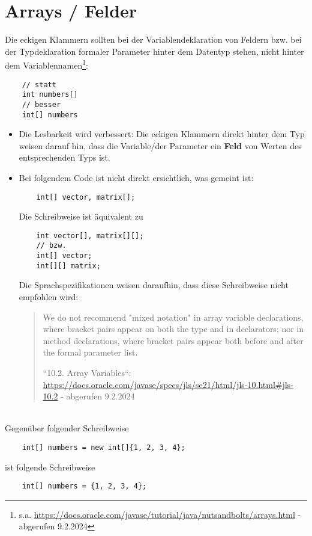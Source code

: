 \section{Arrays / Felder}
Die eckigen Klammern sollten bei der Variablendeklaration von Feldern {bzw.} bei der Typdeklaration formaler Parameter hinter dem Datentyp stehen, nicht hinter dem Variablennamen\footnote{
    s.a. \url{https://docs.oracle.com/javase/tutorial/java/nutsandbolts/arrays.html} - abgerufen 9.2.2024}:

\begin{verbatim}
    // statt
    int numbers[]
    // besser
    int[] numbers
\end{verbatim}

\begin{itemize}
    \item Die Lesbarkeit wird verbessert: Die eckigen Klammern direkt hinter dem Typ weisen darauf hin, dass die Variable/der Parameter ein \textbf{Feld} von Werten des entsprechenden Typs ist.
    \item Bei folgendem Code ist nicht direkt ersichtlich, was gemeint ist:
    \begin{verbatim}
    int[] vector, matrix[];
    \end{verbatim}
    Die Schreibweise ist äquivalent zu
    \begin{verbatim}
    int vector[], matrix[][];
    // bzw.
    int[] vector;
    int[][] matrix;
    \end{verbatim}
    Die Sprachspezifikationen weisen daraufhin, dass diese Schreibweise nicht empfohlen wird:
    \blockquote[{``10.2. Array Variables``: \url{https://docs.oracle.com/javase/specs/jls/se21/html/jls-10.html#jls-10.2} - abgerufen 9.2.2024}]{
        We do not recommend "mixed notation" in array variable declarations, where bracket pairs appear on both the type and in declarators; nor in method declarations, where bracket pairs appear both before and after the formal parameter list.
    }
\end{itemize}\\

\noindent
Gegenüber folgender Schreibweise

\begin{verbatim}
    int[] numbers = new int[]{1, 2, 3, 4};
\end{verbatim}

ist folgende Schreibweise

\begin{verbatim}
    int[] numbers = {1, 2, 3, 4};
\end{verbatim}

